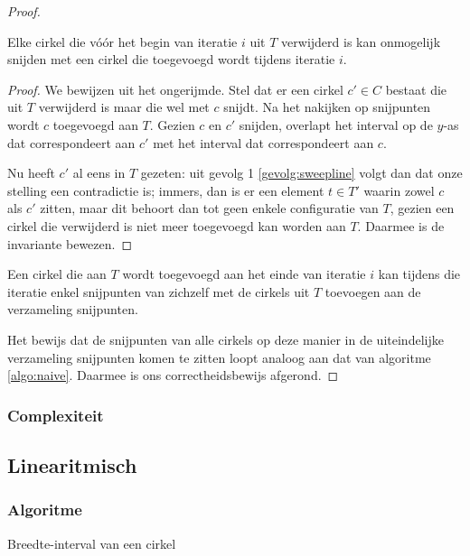 \begin{proof}
\begin{inv}
Elke cirkel die v\'o\'or het begin van iteratie $i$ uit $T$ verwijderd is
kan onmogelijk snijden met een cirkel die toegevoegd wordt tijdens
iteratie $i$.
\label{inv:t1}
\end{inv}

\begin{proof}
We bewijzen uit het ongerijmde. Stel dat er een cirkel $c' \in C$
bestaat die uit $T$ verwijderd is maar die wel met $c$ snijdt. Na het
nakijken op snijpunten wordt $c$ toegevoegd aan $T$. Gezien $c$ en
$c'$ snijden, overlapt het interval op de $y$-as dat correspondeert
aan $c'$ met het interval dat correspondeert aan $c$.

Nu heeft $c'$ al eens in $T$ gezeten: uit gevolg 1
\ref{gevolg:sweepline} volgt dan dat onze stelling een contradictie is;
immers, dan is er een element $t \in T'$ waarin zowel $c$ als $c'$
zitten, maar dit behoort dan tot geen enkele configuratie van $T$,
gezien een cirkel die verwijderd is niet meer toegevoegd kan worden
aan $T$. Daarmee is de invariante bewezen.
\end{proof}

\begin{gevolg} 
Een cirkel die aan $T$ wordt toegevoegd aan het einde van iteratie $i$
kan tijdens die iteratie enkel snijpunten van zichzelf met de cirkels
uit $T$ toevoegen aan de verzameling snijpunten.
\end{gevolg} 

Het bewijs dat de snijpunten van alle cirkels op deze manier in de
uiteindelijke verzameling snijpunten komen te zitten loopt analoog aan
dat van algoritme \ref{algo:naive}. Daarmee is ons correctheidsbewijs afgerond.
\end{proof}
\subsubsection{Complexiteit}



\subsection{Linearitmisch}
\label{sec:linearitmisch}

\subsubsection{Algoritme}

\begin{algorithm}[H]
  \SetAlgoLined
  \caption{Breedte-interval van een cirkel}
\end{algorithm}
\label{algo:interval}

